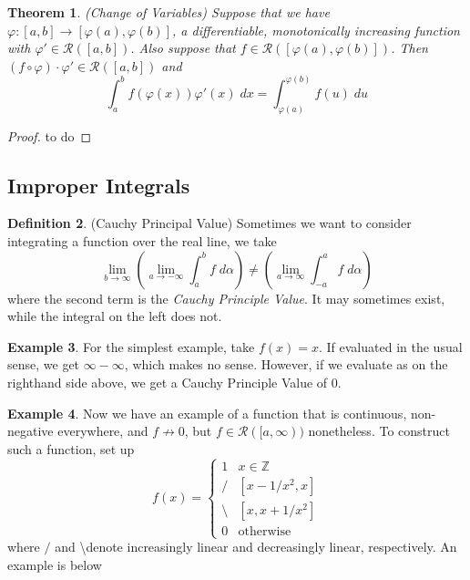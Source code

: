 \documentclass[12pt]{article}
\theoremstyle{plain}
\newtheorem{thm}{Theorem}[subsection]
\theoremstyle{definition}
\newtheorem{defn}[thm]{Definition}
\newtheorem{ex}[thm]{Example}
\theoremstyle{remark}
\begin{document}
\begin{thm}\emph{(Change of Variables)}
Suppose that we have $\varphi: [a,b] \rightarrow [\varphi(a), \varphi(b)]$, a differentiable, monotonically increasing function with $\varphi'\in\mathscr{R}([a,b])$. Also suppose that $f\in\mathscr{R}([\varphi(a),\varphi(b)])$. Then $(f\circ \varphi)\cdot\varphi' \in \mathscr{R}([a,b])$ and
\[
    \int^b_a f\left(\varphi(x)\right) \varphi'(x)\;dx
    = \int^{\varphi(b)}_{\varphi(a)} f(u)\;du
\]
\end{thm}
\begin{proof}
   to do 
\end{proof}


\newpage
\subsection{Improper Integrals}

\begin{defn}
(Cauchy Principal Value) Sometimes we want to consider integrating a function over the real line, we take 
\[
    \lim_{b\rightarrow\infty}
    \left(\lim_{a\rightarrow-\infty} \int^b_a f\;d\alpha
    \right) \neq 
    \left(\lim_{a\rightarrow\infty} \int^a_{-a} f\;d\alpha
    \right)
\]
where the second term is the \emph{Cauchy Principle Value}. It may sometimes exist, while the integral on the left does not. 
\end{defn}

\begin{ex}
For the simplest example, take $f(x)=x$. If evaluated in the usual sense, we get $\infty-\infty$, which makes no sense. However, if we evaluate as on the righthand side above, we get a Cauchy Principle Value of $0$.
\end{ex}

\begin{ex}
Now we have an example of a function that is continuous, non-negative everywhere, and $f\not\rightarrow 0$, but $f\in\mathscr{R}([a,\infty))$ nonetheless.
To construct such a function, set up
\[
    f(x) =
    \begin{cases}
        1 & x\in\mathbb{Z} \\
        / & [x - 1/x^2, x] \\
        \text{\textbackslash} & [x, x + 1/x^2] \\
        0 & \text{otherwise}
    \end{cases}
\]
where $/$ and \textbackslash denote increasingly linear and decreasingly linear, respectively. An example is below
\begin{figure}[h!]
   \centering
\end{figure}
\end{ex}
\end{document}
